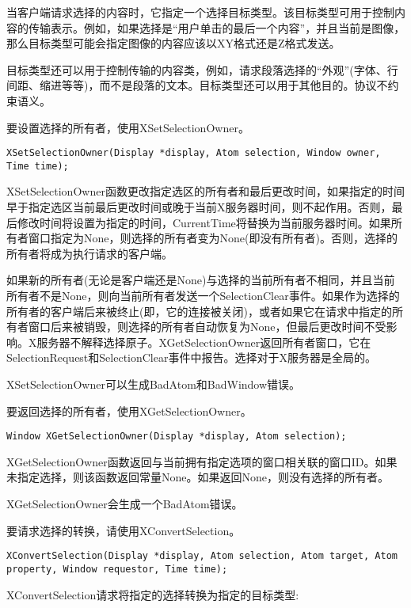当客户端请求选择的内容时，它指定一个选择目标类型。该目标类型可用于控制内容的传输表示。例如，如果选择是“用户单击的最后一个内容”，并且当前是图像，那么目标类型可能会指定图像的内容应该以XY格式还是Z格式发送。

目标类型还可以用于控制传输的内容类，例如，请求段落选择的“外观”(字体、行间距、缩进等等)，而不是段落的文本。目标类型还可以用于其他目的。协议不约束语义。

要设置选择的所有者，使用XSetSelectionOwner。

\begin{lstlisting}
XSetSelectionOwner(Display *display, Atom selection, Window owner, Time time);
\end{lstlisting}

XSetSelectionOwner函数更改指定选区的所有者和最后更改时间，如果指定的时间早于指定选区当前最后更改时间或晚于当前X服务器时间，则不起作用。否则，最后修改时间将设置为指定的时间，CurrentTime将替换为当前服务器时间。如果所有者窗口指定为None，则选择的所有者变为None(即没有所有者)。否则，选择的所有者将成为执行请求的客户端。

如果新的所有者(无论是客户端还是None)与选择的当前所有者不相同，并且当前所有者不是None，则向当前所有者发送一个SelectionClear事件。如果作为选择的所有者的客户端后来被终止(即，它的连接被关闭)，或者如果它在请求中指定的所有者窗口后来被销毁，则选择的所有者自动恢复为None，但最后更改时间不受影响。X服务器不解释选择原子。XGetSelectionOwner返回所有者窗口，它在SelectionRequest和SelectionClear事件中报告。选择对于X服务器是全局的。

XSetSelectionOwner可以生成BadAtom和BadWindow错误。

要返回选择的所有者，使用XGetSelectionOwner。

\begin{lstlisting}
Window XGetSelectionOwner(Display *display, Atom selection);
\end{lstlisting}

XGetSelectionOwner函数返回与当前拥有指定选项的窗口相关联的窗口ID。如果未指定选择，则该函数返回常量None。如果返回None，则没有选择的所有者。

XGetSelectionOwner会生成一个BadAtom错误。

要请求选择的转换，请使用XConvertSelection。
\begin{lstlisting}
XConvertSelection(Display *display, Atom selection, Atom target, Atom property, Window requestor, Time time);
\end{lstlisting}

XConvertSelection请求将指定的选择转换为指定的目标类型:

